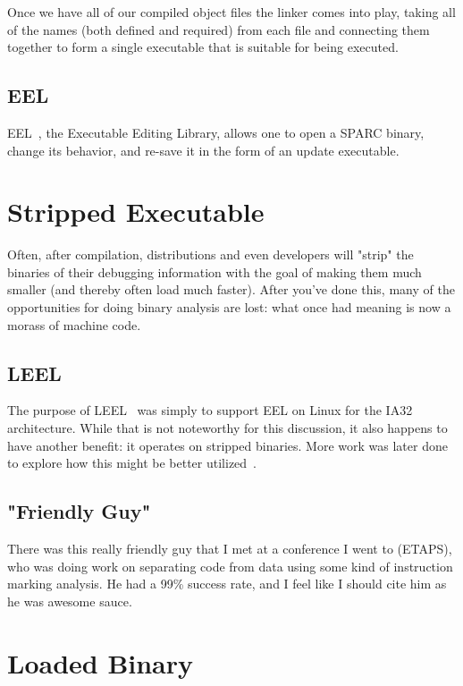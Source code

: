 \documentclass[12pt]{article}
\begin{document}
Once we have all of our compiled object files the linker comes into play, taking all of the names (both defined and required) from each file and connecting them together to form a single executable that is suitable for being executed.

\subsection{EEL}

EEL~\cite{eel}, the Executable Editing Library, allows one to open a SPARC binary, change its behavior, and re-save it in the form of an update executable.

\section{Stripped Executable}

Often, after compilation, distributions and even developers will "strip" the binaries of their debugging information with the goal of making them much smaller (and thereby often load much faster). After you've done this, many of the opportunities for doing binary analysis are lost: what once had meaning is now a morass of machine code.

\subsection{LEEL}

The purpose of LEEL~\cite{leel} was simply to support EEL on Linux for the IA32 architecture. While that is not noteworthy for this discussion, it also happens to have another benefit: it operates on stripped binaries. More work was later done to explore how this might be better utilized~\cite{stripped}.

\subsection{"Friendly Guy"}

There was this really friendly guy that I met at a conference I went to (ETAPS), who was doing work on separating code from data using some kind of instruction marking analysis. He had a 99\% success rate, and I feel like I should cite him as he was awesome sauce.

\section{Loaded Binary}
\end{document}

